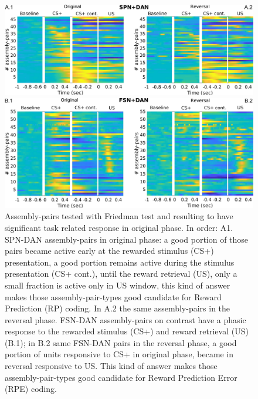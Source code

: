  \begin{figure}
     \centering
     \includegraphics[scale=0.36]{figures/HeatSPN_DAN.pdf}
     
     \vspace{1cm}
     
     \includegraphics[scale=0.36]{figures/HeatFSN_DAN.pdf}
     \caption{Assembly-pairs tested with Friedman test and resulting to have significant task related response in original phase. In order: A1. SPN-DAN assembly-pairs in original phase: a good portion of those pairs became active early at the rewarded stimulus (CS+) presentation, a good portion remains active during the stimulus presentation (CS+ cont.), until the reward retrieval (US), only a small fraction is active only in US window, this kind of answer makes those assembly-pair-types good candidate for Reward Prediction (RP) coding. In A.2 the same assembly-pairs in the reversal phase. FSN-DAN assembly-pairs on contrast have a phasic response to the rewarded stimulus (CS+) and reward retrieval (US) (B.1); in B.2 same FSN-DAN pairs in the reversal phase, a good portion of units responsive to CS+ in original phase, became in reversal responsive to US. This kind of answer makes those assembly-pair-types good candidate for Reward Prediction Error (RPE) coding.}
     \label{fig:HeatPairsDan}
 \end{figure}

